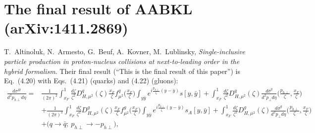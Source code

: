\documentclass[10pt]{article}
\numberwithin{equation}{section}
\begin{document}
\section{The final result of AABKL (arXiv:1411.2869)}\label{sec:aabkl}
T.~Altinoluk, N.~Armesto, G.~Beuf, A.~Kovner, M.~Lublinsky, \emph{Single-inclusive particle production in proton-nucleus collisions at next-to-leading order in the hybrid formalism}. Their final result (``This is the final result of this paper'') is Eq.~(4.20) with Eqs.~(4.21) (quarks) and (4.22) (gluons):
\begin{equation}
\begin{aligned}
\frac{d\sigma^H}{d^2p_{h\perp}d\eta}={}&\frac{1}{(2\pi)^2}\int_{x_F}^1\frac{d\zeta}{\zeta^2}D^q_{H,\mu^2}(\zeta)\frac{x_F}{\zeta}f^q_{\mu^2}\Big(\frac{x_F}{\zeta}\Big)\int_{y\bar y}e^{i\frac{p_{h\perp}}{\zeta}(y-\bar y)}s[y,\bar y]+\int_{x_F}^1\frac{d\zeta}{\zeta^2}D^q_{H,\mu^2}(\zeta)\frac{d\bar\sigma^q}{d^2p_\perp d\eta}\Big(\frac{p_{h\perp}}{\zeta},\frac{x_F}{\zeta}\Big)\\
&+\frac{1}{(2\pi)^2}\int_{x_F}^1\frac{d\zeta}{\zeta^2}D^g_{H,\mu^2}(\zeta)\frac{x_F}{\zeta}f^g_{\mu^2}\Big(\frac{x_F}{\zeta}\Big)\int_{y\bar y}e^{i\frac{p_{h\perp}}{\zeta}(y-\bar y)}s_A[y,\bar y]+\int_{x_F}^1\frac{d\zeta}{\zeta^2}D^g_{H,\mu^2}(\zeta)\frac{d\bar\sigma^g}{d^2p_\perp d\eta}\Big(\frac{p_{h\perp}}{\zeta},\frac{x_F}{\zeta}\Big)\\
&+\big(q\to\bar q;\ p_{h\perp}\to-p_{h\perp}\big),
\end{aligned}
\tag{AABKL 4.20}
\end{equation}
\end{document}
